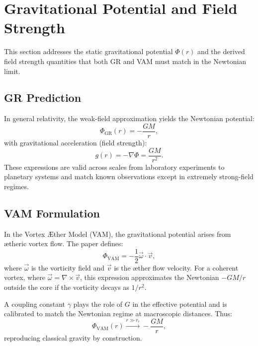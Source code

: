 \section{Gravitational Potential and Field Strength}

This section addresses the static gravitational potential $\Phi(r)$ and the derived field strength quantities that both GR and VAM must match in the Newtonian limit.

\subsection{GR Prediction}
In general relativity, the weak-field approximation yields the Newtonian potential:
\begin{equation}
    \Phi_\text{GR}(r) = -\frac{GM}{r},
\end{equation}
with gravitational acceleration (field strength):
\begin{equation}
    g(r) = -\nabla \Phi = \frac{GM}{r^2}.
\end{equation}
These expressions are valid across scales from laboratory experiments to planetary systems and match known observations except in extremely strong-field regimes.

\subsection{VAM Formulation}
In the Vortex \AE{}ther Model (VAM), the gravitational potential arises from ætheric vortex flow. The paper defines:
\begin{equation}
    \Phi_\text{VAM} = -\frac{1}{2} \vec{\omega} \cdot \vec{v},
\end{equation}
where $\vec{\omega}$ is the vorticity field and $\vec{v}$ is the æther flow velocity. For a coherent vortex, where $\vec{\omega} = \nabla \times \vec{v}$, this expression approximates the Newtonian $-GM/r$ outside the core if the vorticity decays as $1/r^2$.

A coupling constant $\gamma$ plays the role of $G$ in the effective potential and is calibrated to match the Newtonian regime at macroscopic distances. Thus:
\begin{equation}
    \Phi_\text{VAM}(r) \xrightarrow{r \gg r_c} -\frac{GM}{r},
\end{equation}
reproducing classical gravity by construction.


